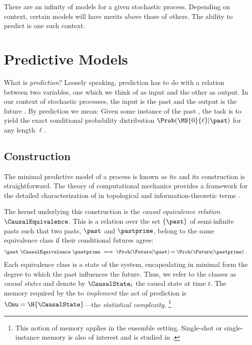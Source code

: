 \documentclass[final,nofootinbib,aps,pre,twocolumn,showpacs,groupaddress,preprintnumbers,floatfix]{revtex4-1}
\begin{document}
There are an infinity of models for a given stochastic process. Depending on
context, certain models will have merits above those of others. The ability to
predict is one such context.

\section{Predictive Models}
\label{sec:prediction}

What is \emph{prediction}? Loosely speaking, prediction has to do with a
relation between two variables, one which we think of as input and the other as
output. In our context of stochastic processes, the input is the past \Past and
the output is the future \Future. By prediction we mean: Given some
instance of the past \past, the task is to yield the exact conditional
probability distribution $\Prob(\MS{0}{\ell} | \past)$ for any length $\ell$.

\subsection{\EM Construction}
\label{subsec:em_construction}

The minimal predictive model of a process \Process is known as its \eM and
its construction is straightforward. The theory of computational mechanics
provides a framework for the detailed characterization of \eMs in topological
and information-theoretic terms \cite{Crut12a}.

The kernel underlying this construction is the \emph{causal equivalence
relation} $\CausalEquivalence$. This is a relation over the set $\{\past\}$ of
semi-infinite pasts such that two pasts, $\past$ and $\pastprime$, belong to
the same equivalence class if their conditional futures agree:
\begin{align*}
  \past ~\CausalEquivalence~ \pastprime \iff \Prob(\Future | \past)
  = \Prob(\Future | \pastprime)
  ~.
\end{align*}
Each equivalence class is a state of the system, encapsulating in minimal form
the degree to which the past influences the future. Thus, we refer to the
classes as \emph{causal states} and denote by $\CausalState_t$ the causal state
at time $t$. The memory required by the \eM to \emph{implement} the act of
prediction is $\Cmu = \H{\CausalState}$---the \emph{statistical complexity}.
\footnote{This notion of memory applies in the ensemble setting. Single-shot or single-instance memory is also of interest and is studied in .}
\end{document}
